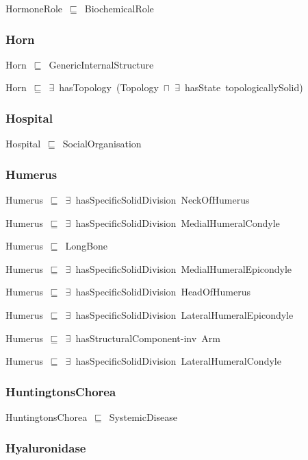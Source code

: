 \documentclass{article}
\begin{document}
HormoneRole~\ensuremath{\sqsubseteq}~BiochemicalRole~

\subsubsection*{Horn}

Horn~\ensuremath{\sqsubseteq}~GenericInternalStructure~

Horn~\ensuremath{\sqsubseteq}~\ensuremath{\exists}~hasTopology~(Topology~\ensuremath{\sqcap}~\ensuremath{\exists}~hasState~topologicallySolid)~

\subsubsection*{Hospital}

Hospital~\ensuremath{\sqsubseteq}~SocialOrganisation~

\subsubsection*{Humerus}

Humerus~\ensuremath{\sqsubseteq}~\ensuremath{\exists}~hasSpecificSolidDivision~NeckOfHumerus~

Humerus~\ensuremath{\sqsubseteq}~\ensuremath{\exists}~hasSpecificSolidDivision~MedialHumeralCondyle~

Humerus~\ensuremath{\sqsubseteq}~LongBone~

Humerus~\ensuremath{\sqsubseteq}~\ensuremath{\exists}~hasSpecificSolidDivision~MedialHumeralEpicondyle~

Humerus~\ensuremath{\sqsubseteq}~\ensuremath{\exists}~hasSpecificSolidDivision~HeadOfHumerus~

Humerus~\ensuremath{\sqsubseteq}~\ensuremath{\exists}~hasSpecificSolidDivision~LateralHumeralEpicondyle~

Humerus~\ensuremath{\sqsubseteq}~\ensuremath{\exists}~hasStructuralComponent-inv~Arm~

Humerus~\ensuremath{\sqsubseteq}~\ensuremath{\exists}~hasSpecificSolidDivision~LateralHumeralCondyle~

\subsubsection*{HuntingtonsChorea}

HuntingtonsChorea~\ensuremath{\sqsubseteq}~SystemicDisease~

\subsubsection*{Hyaluronidase}
\end{document}
